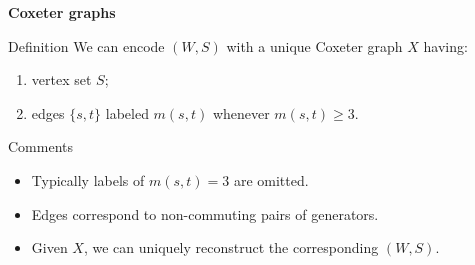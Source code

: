 \documentclass[9pt,handout]{beamer}
\newcommand{\<}{\langle}
\renewcommand{\>}{\rangle}
\begin{document}

\begin{frame}{\textbf{Coxeter graphs}} \pause

\begin{block}{Definition}
We can encode $(W,S)$ with a unique \alert{Coxeter graph} $X$ having: 

\begin{enumerate}
\item vertex set $S$;
\item edges $\{s,t\}$ labeled $m(s,t)$ whenever $m(s,t)\geq 3$.
\end{enumerate}
\end{block}

\pause

\begin{block}{Comments}

\begin{itemize}

\item Typically labels of $m(s,t)=3$ are omitted.

\item Edges correspond to non-commuting pairs of generators.

\item Given $X$, we can uniquely reconstruct the corresponding $(W,S)$.

\end{itemize}

\end{block}

\end{frame}

\end{document}
